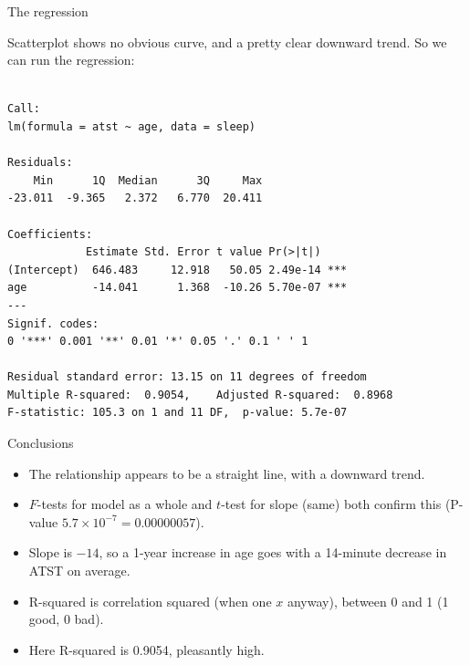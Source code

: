 \begin{frame}[fragile]{The regression}

Scatterplot shows no obvious curve, and a pretty clear downward trend. So we can run the regression:

{\scriptsize
 
\begin{knitrout}
\color{fgcolor}\begin{kframe}
\begin{alltt}
\hlkwb{=}\hlopt{~} 
\end{alltt}
\begin{verbatim}

Call:
lm(formula = atst ~ age, data = sleep)

Residuals:
    Min      1Q  Median      3Q     Max 
-23.011  -9.365   2.372   6.770  20.411 

Coefficients:
            Estimate Std. Error t value Pr(>|t|)    
(Intercept)  646.483     12.918   50.05 2.49e-14 ***
age          -14.041      1.368  -10.26 5.70e-07 ***
---
Signif. codes:  
0 '***' 0.001 '**' 0.01 '*' 0.05 '.' 0.1 ' ' 1

Residual standard error: 13.15 on 11 degrees of freedom
Multiple R-squared:  0.9054,	Adjusted R-squared:  0.8968 
F-statistic: 105.3 on 1 and 11 DF,  p-value: 5.7e-07
\end{verbatim}
\end{kframe}
\end{knitrout}
}


\end{frame}

\begin{frame}{Conclusions}

    \begin{itemize}
  \item The relationship appears to be a straight line, with a downward trend.
  \item $F$-tests for model as a whole and $t$-test for slope (same)
    both confirm this (P-value $5.7\times 10^{-7}=0.00000057$).
  \item Slope is $-14$, so a 1-year increase in age goes with a 14-minute decrease in ATST on average.
  \item R-squared is correlation squared (when one $x$ anyway),
    between 0 and 1 (1 good, 0 bad).
  \item Here R-squared is 0.9054, pleasantly high.
  \end{itemize}
  
\end{frame}

